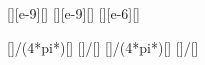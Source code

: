 [\nano\meter][e-9][\m]
[\micro\gram][e-9][\kg]
[\micro\meter][e-6][\m]

[]{\nchX/(4*pi*\xeX)}[\kgmps]
[]{\peX/\ncmeX}[\mps]
[]{\nchX/(4*pi*\xdX)}[\kgmps]
[]{\pdX/\mdX}[\mps]
